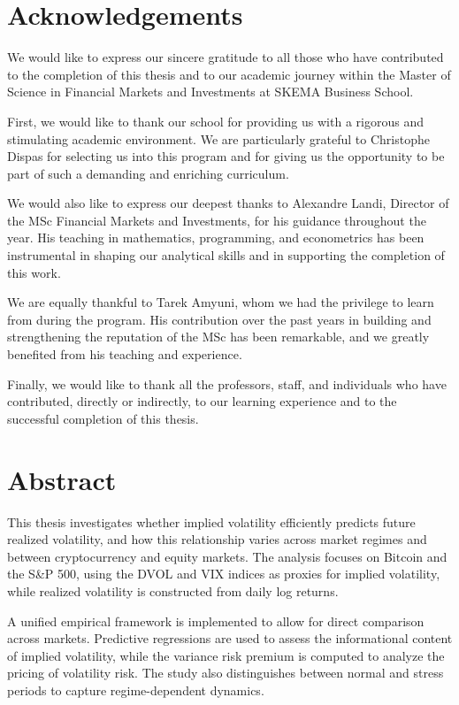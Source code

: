 \documentclass[11pt,a4paper,openany]{report}
\begin{document}
\chapter*{Acknowledgements}
\label{acknowledgements}

We would like to express our sincere gratitude to all those who have
contributed to the completion of this thesis and to our academic journey
within the Master of Science in Financial Markets and Investments at
SKEMA Business School.

First, we would like to thank our school for providing us with a
rigorous and stimulating academic environment. We are particularly
grateful to Christophe Dispas for selecting us into this program and for
giving us the opportunity to be part of such a demanding and enriching
curriculum.

We would also like to express our deepest thanks to Alexandre Landi,
Director of the MSc Financial Markets and Investments, for his guidance
throughout the year. His teaching in mathematics, programming, and
econometrics has been instrumental in shaping our analytical skills and
in supporting the completion of this work.

We are equally thankful to Tarek Amyuni, whom we had the privilege to
learn from during the program. His contribution over the past years in
building and strengthening the reputation of the MSc has been
remarkable, and we greatly benefited from his teaching and experience.

Finally, we would like to thank all the professors, staff, and
individuals who have contributed, directly or indirectly, to our
learning experience and to the successful completion of this thesis.

\chapter*{Abstract}
\label{abstract}

This thesis investigates whether implied volatility efficiently predicts
future realized volatility, and how this relationship varies across
market regimes and between cryptocurrency and equity markets. The
analysis focuses on Bitcoin and the S\&P 500, using the DVOL and VIX
indices as proxies for implied volatility, while realized volatility is
constructed from daily log returns.

A unified empirical framework is implemented to allow for direct
comparison across markets. Predictive regressions are used to assess the
informational content of implied volatility, while the variance risk
premium is computed to analyze the pricing of volatility risk. The study
also distinguishes between normal and stress periods to capture
regime-dependent dynamics.
\end{document}
